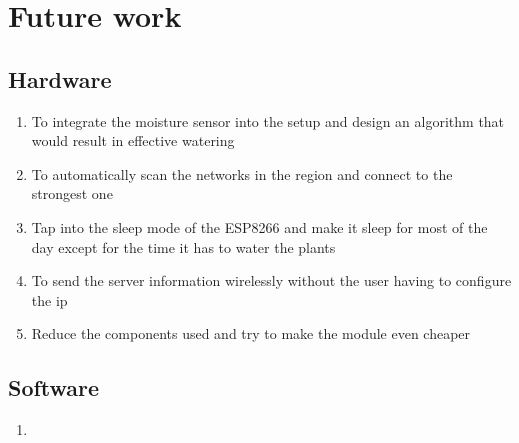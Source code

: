 \documentclass[16pt]{article}
\begin{document}
\vspace{19cm}

\section{Future work}

\vspace{0.5cm}

\subsection{Hardware}
\begin{enumerate}
 \item To integrate the moisture sensor into the setup and design an algorithm that would result in effective watering 
 \item To automatically scan the networks in the region and connect to the strongest one
 \item Tap into the sleep mode of the ESP8266 and make it sleep for most of the day except for the time 
 it has to water the plants
 \item To send the server information wirelessly without the user having to configure the ip
 \item Reduce the components used and try to make the module even cheaper  
\end{enumerate}

\vspace{0.5cm}

\subsection{Software}
\begin{enumerate}
 \item 
\end{enumerate}
\end{document}
